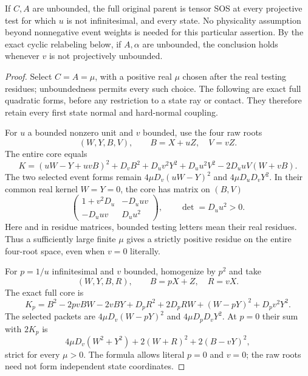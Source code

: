 \begin{theorem}
If $C,A$ are unbounded, the full original parent is tensor SOS at every
projective test for which $u$ is not infinitesimal, and every state.
No physicality assumption beyond nonnegative event weights is needed for
this particular assertion. By the exact cyclic relabeling below, if
$A,\alpha$ are unbounded, the conclusion holds whenever $v$ is not
projectively unbounded.
\end{theorem}
\begin{proof}
Select $C=A=\mu$, with a positive real $\mu$ chosen after the real testing
residues; unboundedness permits every such choice. The following are exact
full quadratic forms, before any restriction to a state ray or contact.
They therefore retain every first state normal and hard-normal coupling.

For $u$ a bounded nonzero unit and $v$ bounded, use the four raw roots
\[
 (W,Y,B,V),\qquad B=X+uZ,\quad V=vZ.
\]
The entire core equals
\[
 K=(uW-Y+uvB)^2+D_vB^2+D_uv^2Y^2+D_uu^2V^2
       -2D_uuV(W+vB).                         \tag{CE2}
\]
The two selected event forms remain $4\mu D_v(uW-Y)^2$ and
$4\mu D_uD_vY^2$. In their common real kernel $W=Y=0$, the core has
matrix on $(B,V)$
\[
 \begin{pmatrix}1+v^2D_u&-D_uuv\\-D_uuv&D_uu^2\end{pmatrix},
 \qquad \det=D_uu^2>0.                       \tag{CE3}
\]
Here and in residue matrices, bounded testing letters mean their real
residues. Thus a sufficiently large finite $\mu$ gives a strictly positive
residue on the entire four-root space, even when $v=0$ literally.

For $p=1/u$ infinitesimal and $v$ bounded, homogenize by $p^2$ and take
\[
 (W,Y,B,R),\qquad B=pX+Z,\quad R=vX.
\]
The exact full core is
\[
 K_p=B^2-2pvBW-2vBY+D_pR^2+2D_pRW
                  +(W-pY)^2+D_pv^2Y^2.       \tag{CE4}
\]
The selected packets are $4\mu D_v(W-pY)^2$ and
$4\mu D_pD_vY^2$. At $p=0$ their sum with $2K_p$ is
\[
 4\mu D_v(W^2+Y^2)+2(W+R)^2+2(B-vY)^2,       \tag{CE5}
\]
strict for every $\mu>0$. The formula allows literal $p=0$ and $v=0$;
the raw roots need not form independent state coordinates.


\end{proof}
